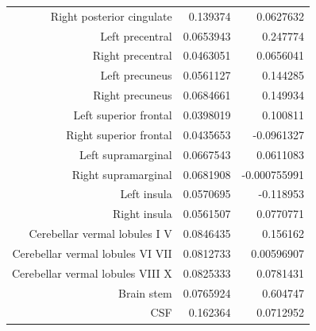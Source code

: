 \documentclass{article}
\begin{document}
\begin{table}
\begin{tabular}{|r|r|r|}
      Right posterior cingulate & 0.139374 & 0.0627632 \\
      Left precentral & 0.0653943 & 0.247774 \\
      Right precentral & 0.0463051 & 0.0656041 \\
      Left precuneus & 0.0561127 & 0.144285 \\
      Right precuneus & 0.0684661 & 0.149934 \\
      Left superior frontal & 0.0398019 & 0.100811 \\
      Right superior frontal & 0.0435653 & -0.0961327 \\
      Left supramarginal & 0.0667543 & 0.0611083 \\
      Right supramarginal & 0.0681908 & -0.000755991 \\
      Left insula & 0.0570695 & -0.118953 \\
      Right insula & 0.0561507 & 0.0770771 \\
      Cerebellar vermal lobules I V & 0.0846435 & 0.156162 \\
      Cerebellar vermal lobules VI VII & 0.0812733 & 0.00596907 \\
      Cerebellar vermal lobules VIII X & 0.0825333 & 0.0781431 \\
      Brain stem & 0.0765924 & 0.604747 \\
      CSF & 0.162364 & 0.0712952 \\\hline\hline
    \end{tabular}
  \end{table}
\end{document}
